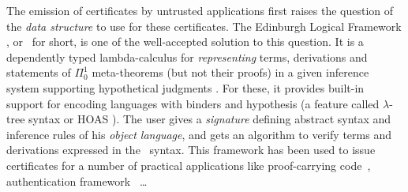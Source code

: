 \documentclass{llncs}
\begin{document}
The emission of certificates by untrusted applications first raises
the question of the \emph{data structure} to use for these
certificates. %
The Edinburgh Logical Framework \cite{harper1993framework}, or \LF\
for short, is one of the well-accepted solution to this question. It
is a dependently typed lambda-calculus for \emph{representing} terms,
derivations and statements of $\Pi_0^1$ meta-theorems (but not their
proofs) in a given inference system supporting hypothetical judgments
\cite{pfenning2001logical}. For these, it provides built-in support
for encoding languages with binders and hypothesis (a feature called
$\lambda$-tree syntax or HOAS \cite{pfenning1988higher}). The user
gives a \emph{signature} defining abstract syntax and inference rules
of his \emph{object language}, and gets an algorithm to verify terms
and derivations expressed in the \LF\ syntax.
This framework has been used to issue certificates for a number of
practical applications like proof-carrying
code~\cite{necula1997proof}, authentication
framework~\cite{appel1999proof} \ldots %
\end{document}
